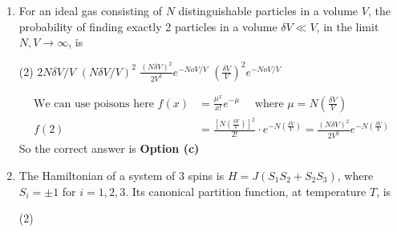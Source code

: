 \begin{enumerate}
 If the two curves coincide when $I(v, T) v^{a}$ is plotted against $v^{b} / T$, then the values of $a$ and $b$ are, respectively,
 \begin{tasks}(4)
	 and 1
	\task[\textbf{b.}]$-2$ and 2
	 and $-1$
	\task[\textbf{d.}] $-3$ and 1
\end{tasks}
\begin{answer}
	\begin{align*}
	I&=\frac{8 \pi v^{3}}{c^{3}} \frac{h}{\left(\frac{h v}{e^{k_{B} T}}-1\right)} \Rightarrow y=I v^{a}=\frac{8 \pi v^{a+3}}{c^{3}} \frac{h}{\left(\frac{h v}{e^{k_{B} T}} v^{b} v^{-b}-1\right)}\\
	\text{Let }x&=v^{b} / T \Rightarrow y=\frac{8 \pi h}{c^{3}} \frac{v^{a+3}}{\left(e^{\frac{h v^{-b+1}}{k_{B}} x}-1\right)}\\
	\text{For, }a&=-3, b=1 ; \quad y=\alpha \frac{1}{\left(e^{\beta x}-1\right)}\text{Both graph are now same}
	\end{align*}
	So the correct answer is \textbf{Option (d)}
\end{answer}
\item For an ideal gas consisting of $N$ distinguishable particles in a volume $V$, the probability of finding exactly 2 particles in a volume $\delta V \ll V$, in the limit $N, V \rightarrow \infty$, is
 \begin{tasks}(2)
	\task[\textbf{a.}] $2 N \delta V / V$
	\task[\textbf{b.}]$(N \delta V / V)^{2}$
	\task[\textbf{c.}]$\frac{(N \delta V)^{2}}{2 V^{2}} e^{-N o V / V}$
	\task[\textbf{d.}]  $\left(\frac{\delta V}{V}\right)^{2} e^{-N o V / V}$
\end{tasks}
\begin{answer}
	\begin{align*}
	\text{We can use poisons here }f(x)&=\frac{\mu^{x}}{x !} e^{-\mu}\quad
\text{	where }\mu=N\left(\frac{\delta V}{V}\right)\\
f(2)&=\frac{\left[N\left(\frac{\delta V}{V}\right)\right]^{2}}{2 !} \cdot e^{-N\left(\frac{\delta V}{V}\right)}=\frac{(N \delta V)^{2}}{2 V^{2}} e^{-N\left(\frac{\delta V}{V}\right)}
	\end{align*}
		So the correct answer is \textbf{Option (c)}
\end{answer}
\item The Hamiltonian of a system of 3 spins is $H=J\left(S_{1} S_{2}+S_{2} S_{3}\right)$, where $S_{i}=\pm 1$ for $i=1,2,3$. Its canonical partition function, at temperature $T$, is
 \begin{tasks}(2)

\end{tasks}
\end{enumerate}
